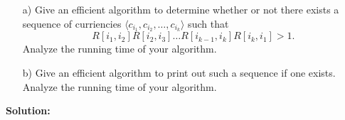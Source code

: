 \documentclass[a4paper, 11pt]{article}
\newcommand{\solution}{\textbf{Solution:}}
\begin{document}
\begin{itemize}
	\item [a)] Give an efficient algorithm to determine whether or not there exists a sequence of curriencies $\langle c_{i_1}, c_{i_2}, \dots, c_{i_k} \rangle$ such that
	\begin{equation*}
		R[i_1, i_2] R[i_2, i_3] \dots R[i_{k-1}, i_k] R[i_k, i_1] > 1.
	\end{equation*}
	Analyze the running time of your algorithm.

	\item[b)] Give an efficient algorithm to print out such a sequence if one exists. Analyze the running time of your algorithm.

\end{itemize}

\solution
\end{document}
